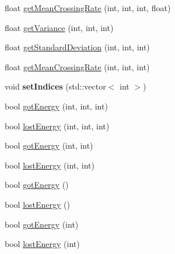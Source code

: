 \begin{DoxyCompactItemize}
\item 
float \hyperlink{classRoggenFeatureExtraction_abc1fe2fc6d6b562e1f5c92d0b36334e7}{getMeanCrossingRate} (int, int, int, float)
\item 
float \hyperlink{classRoggenFeatureExtraction_ac48e7423605dd4f0b449d081cccc77bf}{getVariance} (int, int, int)
\item 
float \hyperlink{classRoggenFeatureExtraction_aaa92fd1d82e3e6d431701ed5dbf45a07}{getStandardDeviation} (int, int, int)
\item 
float \hyperlink{classRoggenFeatureExtraction_aa8622eb806834314c8c0b4e3a7f26f2c}{getMeanCrossingRate} (int, int, int)
\item 
\hypertarget{classRoggenFeatureExtraction_a7821007498b55a9a0f9acbe09b82f055}{
void {\bfseries setIndices} (std::vector$<$ int $>$)}
\label{classRoggenFeatureExtraction_a7821007498b55a9a0f9acbe09b82f055}

\item 
bool \hyperlink{classRoggenFeatureExtraction_a1f981cb1f8e481480a0feab550121b8e}{gotEnergy} (int, int, int)
\item 
bool \hyperlink{classRoggenFeatureExtraction_a261efc9381862b08542148db4128df3a}{lostEnergy} (int, int, int)
\item 
bool \hyperlink{classRoggenFeatureExtraction_ab5fa2410c5f12bcfbe4135c0995cb411}{gotEnergy} (int, int)
\item 
bool \hyperlink{classRoggenFeatureExtraction_a37b1853c92fdd4c10e0dd7fc35770eda}{lostEnergy} (int, int)
\item 
bool \hyperlink{classRoggenFeatureExtraction_a4fda7caa695bf01ac5693990bb0a3182}{gotEnergy} ()
\item 
bool \hyperlink{classRoggenFeatureExtraction_a4d65f5dc285a949f38a92befc663f45b}{lostEnergy} ()
\item 
bool \hyperlink{classRoggenFeatureExtraction_ae1028692308f074789b65831af17fc7c}{gotEnergy} (int)
\item 
bool \hyperlink{classRoggenFeatureExtraction_aba7984acb4d1c5ef2d63917a45751ca1}{lostEnergy} (int)
\end{DoxyCompactItemize}
